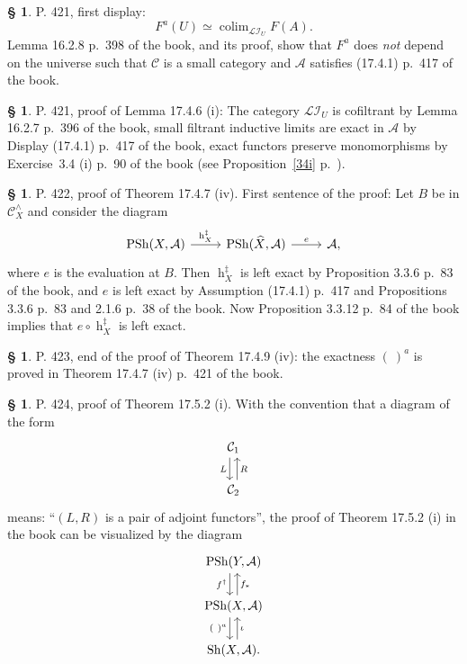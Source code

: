 \documentclass[12pt]{article}%
\theoremstyle{remark}
\theoremstyle{definition}
\newtheorem{s}[thm]{\S}%
\newcommand{\cc}{\mathcal}
\newcommand{\oo}{\operatorname}
\newcommand{\A}{\mathcal A}
\newcommand{\C}{\mathcal C}
\DeclareMathOperator*{\colim}{colim}
\begin{document}
%

\begin{s}\label{fau}
P. 421, first display: 
$$
F^a(U)\simeq\colim_{\cc{LI}_U}F(A).
$$ 
Lemma 16.2.8 p.~398 of the book, and its proof, show that $F^a$ does {\em not} depend on the universe such that $\C$ is a small category and $\A$ satisfies (17.4.1) p.~417 of the book.
\end{s}

%

\begin{s}P. 421, proof of Lemma 17.4.6 (i): The category $\cc{LI}_U$ is cofiltrant by Lemma 16.2.7 p.~396 of the book, small filtrant inductive limits are exact in $\A$ by Display (17.4.1) p.~417 of the book, exact functors preserve monomorphisms by Exercise~3.4 (i) p.~90 of the book (see Proposition~\ref{34i} p.~\pageref{34i}).
\end{s}

%

\begin{s} 
P. 422, proof of Theorem 17.4.7 (iv). First sentence of the proof: Let $B$ be in $\C_X^\wedge$ and consider the diagram 
$$
\begin{tikzcd}
\oo{PSh}(X,\A)\ar{r}{\oo h_X^\ddagger}&\oo{PSh}(\widehat X,\A)\ar{r}{e}&\A,
\end{tikzcd}
$$ 
where $e$ is the evaluation at $B$. Then $\oo h_X^\ddagger$ is left exact by Proposition 3.3.6 p.~83 of the book, and $e$ is left exact by Assumption (17.4.1) p.~417 and Propositions 3.3.6 p.~83 and 2.1.6 p.~38 of the book. Now Proposition 3.3.12 p.~84 of the book implies that $e\circ\oo h_X^\ddagger$ is left exact. 
\end{s}

%

\begin{s} 
P. 423, end of the proof of Theorem 17.4.9 (iv): the exactness $(\ )^a$ is proved in Theorem 17.4.7 (iv) p.~421 of the book.
\end{s}

%

\begin{s} 
P. 424, proof of Theorem 17.5.2 (i). With the convention that a diagram of the form 
$$
\begin{tikzcd} 
\C_1\ar[xshift=-0.7ex]{d}[swap]{L}\\ \C_2\ar[xshift=0.7ex]{u}[swap]{R}
\end{tikzcd}
$$ 
means: ``$(L,R)$ is a pair of adjoint functors'', the proof of Theorem 17.5.2 (i) in the book can be visualized by the diagram 
$$
\begin{tikzcd} 
\oo{PSh}(Y,\A)\ar[xshift=-0.7ex]{d}[swap]{f^\dagger}\\ 
\oo{PSh}(X,\A)\ar[xshift=0.7ex]{u}[swap]{f_*}\ar[xshift=-0.7ex]{d}[swap]{(\ )^a}\\ 
\oo{Sh}(X,\A).\ar[xshift=0.7ex]{u}[swap]{\iota}
\end{tikzcd}
$$ 
\end{s}
\end{document}
